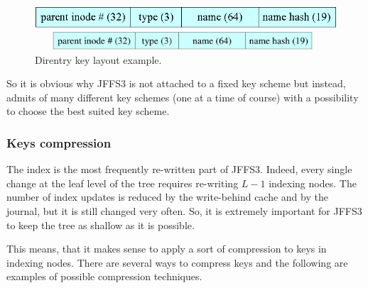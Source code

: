 %
%
\begin{figure}[h]
\begin{center}
\begin{htmlonly}
\includegraphics{pics/keyex-01.png}
\end{htmlonly}
\includegraphics[width=110mm,height=7mm]{pics/keyex-01.pdf}
\end{center}
\caption{Direntry key layout example.}
\label{ref_FigureDirentKeyEx_01}
\end{figure}

So it is obvious why JFFS3 is not attached to a fixed key scheme but instead,
admits of many different key schemes (one at a time of course) with a
possibility to choose the best suited key scheme.

%
%
\subsubsection{Keys compression} \label{ref_SectionKeysCompr}

The index is the most frequently \mbox{re-written} part of JFFS3. Indeed, every
single change at the leaf level of the tree requires \mbox{re-writing} $L-1$
indexing nodes. The number of index updates is reduced by the
\mbox{write-behind} cache and by the \mbox{journal}, but it is still changed
very often.  So, it is extremely important for JFFS3 to keep the tree as
shallow as it is possible.

This means, that it makes sense to apply a sort of compression to keys in
indexing nodes. There are several ways to compress keys and the following are
examples of possible compression techniques.

